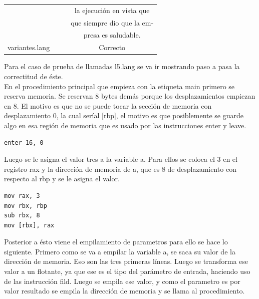 \documentclass[11pt, spanish]{report}
\begin{document}
\begin{itemize}
\begin{table}[!hbp]
\begin{tabular}{c c c c}
                                  &                        &                       & la ejecuci\'on en vista que \\ [1ex] 
                                  &                        &                       & que siempre dio que la em-  \\ [1ex] 
                                  &                        &                       & presa es saludable.         \\ [1ex] 
      variantes.lang              &                        &                       & Correcto                    \\ [1ex] 
      \hline
    \end{tabular}    
  \end{table}

\end{itemize}

Para el caso de prueba de llamadas l5.lang se va ir mostrando paso a pasa la correctitud de \'este.\\

En el procedimiento principal que empieza con la etiqueta main primero se reserva memoria. Se reservan 8 
bytes dem\'as porque los desplazamientos empiezan en 8. El motivo es que no se puede tocar la secci\'on 
de memoria con desplazamiento 0, la cual ser\'ial [rbp], el motivo es que posiblemente se guarde algo
en esa regi\'on de memoria que es usado por las instrucciones enter y leave.\\

\begin{verbatim}
enter 16, 0
\end{verbatim}

Luego se le asigna el valor tres a la variable a. Para ellos se coloca el 3 en el registro rax y la direcci\'on
de memoria de a, que es 8 de desplazamiento con respecto al rbp y se le asigna el valor.\\

\begin{verbatim}
mov rax, 3
mov rbx, rbp
sub rbx, 8
mov [rbx], rax
\end{verbatim}

Posterior a \'esto viene el empilamiento de parametros para ello se hace lo siguiente. Primero como
se va a empilar la variable a, se saca su valor de la direcci\'on de memoria. Eso son las tres
primeras l\'ineas. Luego se transforma ese valor a un flotante, ya que ese es el tipo del par\'ametro de entrada, haciendo uso de las instrucci\'on
fild. Luego se empila ese valor, y como el parametro es por valor resultado se empila la direcci\'on de memoria y se llama al procedimiento.\\
\end{document}

